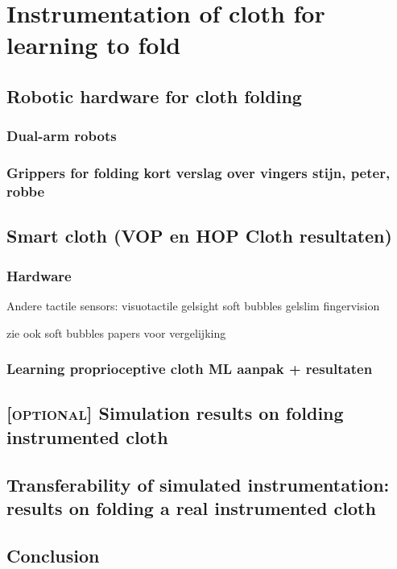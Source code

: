 \documentclass[\home/main.tex]{subfiles}
\begin{document}
\chapter{Instrumentation of cloth for learning to fold}\label{ch:instrumentation}

\section{Robotic hardware for cloth folding}
\subsection{Dual-arm robots}
\subsection{Grippers for folding \tiny{kort verslag over vingers stijn, peter, robbe}}


\section{Smart cloth \tiny{(VOP en HOP Cloth resultaten)}}
\subsection{Hardware} %

Andere tactile sensors:
    visuotactile
        gelsight
        soft bubbles
        gelslim
        fingervision

    zie ook soft bubbles papers voor vergelijking 

\subsection{Learning proprioceptive cloth \tiny{ML aanpak + resultaten}}

\section{\textsc{[optional]} Simulation results on folding instrumented cloth}
\section{Transferability of simulated instrumentation: results on folding a real instrumented cloth}
\section{Conclusion}
\end{document}
